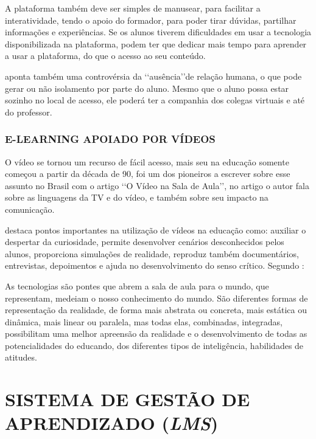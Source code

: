 A plataforma também deve ser simples de manusear, para facilitar a interatividade, tendo o apoio do formador, para poder tirar dúvidas, partilhar informações e experiências. Se os alunos tiverem dificuldades em usar a tecnologia disponibilizada na plataforma, podem ter que dedicar mais tempo para aprender a usar a plataforma, do que o acesso ao seu conteúdo. 

 aponta também uma controvérsia da \lq\lq ausência\rq\rq de relação humana, o que pode gerar ou não isolamento por parte do aluno. Mesmo que o aluno possa estar sozinho no local de acesso, ele poderá ter a companhia dos colegas virtuais e até do professor.

\subsubsection{E-LEARNING APOIADO POR VÍDEOS}
O vídeo se tornou um recurso de fácil acesso, mais seu na educação somente começou a partir da década de 90,  foi um dos pioneiros a escrever sobre esse assunto no Brasil com o artigo \lq\lq O Vídeo na Sala de Aula\rq\rq, no artigo o autor fala sobre as linguagens da TV e do vídeo, e também sobre seu impacto na comunicação.

 destaca pontos importantes na utilização de vídeos na educação como: auxiliar o despertar da curiosidade, permite desenvolver cenários desconhecidos pelos alunos, proporciona simulações de realidade, reproduz também documentários, entrevistas, depoimentos e ajuda no desenvolvimento do senso crítico. Segundo :
\begin{citacao}
  As tecnologias são pontes que abrem a sala de aula para o mundo, que representam, medeiam o nosso conhecimento do mundo. São diferentes formas de representação da realidade, de forma mais abstrata ou concreta, mais estática ou dinâmica, mais linear ou paralela, mas todas elas, combinadas, integradas, possibilitam uma melhor apreensão da realidade e o desenvolvimento de todas as potencialidades do educando, dos diferentes tipos de inteligência, habilidades de atitudes.
\end{citacao}

\section{SISTEMA DE GESTÃO DE APRENDIZADO (\textit{LMS})}

